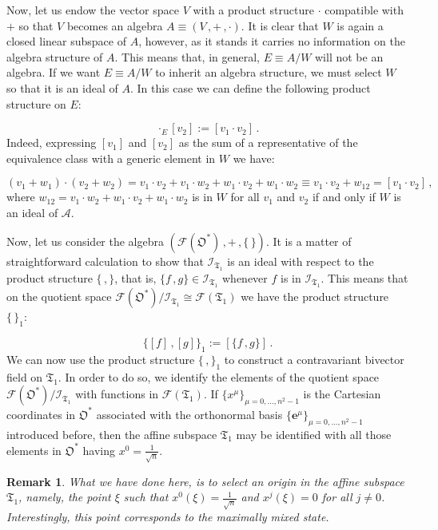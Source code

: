 \documentclass[11pt]{article}
\newcommand{\be}{\begin{equation}}
\newcommand{\ee}{\end{equation}}
\newcommand{\vsp}{\vspace{0.4cm}}
\newcommand{\obsp}{\mathfrak{O}}
\newtheorem{rem}{Remark}
\begin{document}
Now, let us endow the vector space $V$ with a product structure $\cdot$ compatible with $+$ so that $V$ becomes an algebra $A\equiv(V\,,+\,,\cdot)$.
It is clear that $W$ is again a closed linear subspace of $A$, however, as it stands it carries no information on the algebra structure of $A$.
This means that, in general, $E\equiv A/W$ will not be an algebra. 
If we want $E\equiv A/W$ to inherit an algebra structure, we must select $W$ so that it is an ideal of $A$.
In this case we can define the following product structure on $E$:

\be
[v_{1}]\cdot_{E}[v_{2}]:=[v_{1}\cdot v_{2}]\,.
\ee
Indeed, expressing $[v_{1}]$ and $[v_{2}]$ as the sum of a representative of the equivalence class with a generic element in $W$ we have:

\be
(v_{1} + w_{1})\cdot(v_{2} + w_{2})=v_{1}\cdot v_{2} + v_{1}\cdot w_{2} + w_{1}\cdot v_{2} + w_{1}\cdot w_{2}\equiv v_{1}\cdot v_{2} + w_{12}=[v_{1}\cdot v_{2}]\,,
\ee
where $w_{12}=v_{1}\cdot w_{2} + w_{1}\cdot v_{2} + w_{1}\cdot w_{2}$ is in $W$ for all $v_{1}$ and $v_{2}$ if and only if $W$ is an ideal of $\mathcal{A}$.

\vsp

Now, let us consider the algebra $(\mathcal{F}(\obsp^{*})\,,+\,,\{\,\})$. 
It is a matter of straightforward calculation to show that $\mathcal{I}_{\mathfrak{T}_{1}}$ is an ideal with respect to the product structure $\{\,,\}$, that is, $\{f\,,g\}\in\mathcal{I}_{\mathfrak{T}_{1}}$ whenever $f$ is in $\mathcal{I}_{\mathfrak{T}_{1}}$.
This means that on the quotient space $\mathcal{F}(\obsp^{*})/\mathcal{I}_{\mathfrak{T}_{1}}\cong\mathcal{F}(\mathfrak{T}_{1})$ we have the product structure $\{\,\}_{1}$:

\be
\{[f]\,,[g]\}_{1}:=\left[\{f\,,g\}\right]\,.
\ee
We can now use the product structure $\{\,,\}_{1}$ to construct a contravariant bivector field on $\mathfrak{T}_{1}$.
In order to do so, we identify the elements of the quotient space $\mathcal{F}(\obsp^{*})/\mathcal{I}_{\mathfrak{T}_{1}}$ with functions in $\mathcal{F}(\mathfrak{T}_{1})$.
If $\{x^{\mu}\}_{\mu=0,...,n^{2}-1}$ is the Cartesian coordinates in $\obsp^{*}$ associated with the orthonormal basis $\{\mathbf{e}^{\mu}\}_{\mu=0,...,n^{2}-1}$ introduced before, then the affine subspace $\mathfrak{T}_{1}$ may be identified with all those elements in $\obsp^{*}$ having $x^{0}=\frac{1}{\sqrt{n}}$.

\begin{rem}
What we have done here, is to select an origin in the affine subspace $\mathfrak{T}_{1}$, namely,  the point $\xi$ such that $x^{0}(\xi)=\frac{1}{\sqrt{n}}$ and $x^{j}(\xi)=0$ for all $j\neq0$. Interestingly, this point corresponds to the maximally mixed state.
\end{rem}
\end{document}

